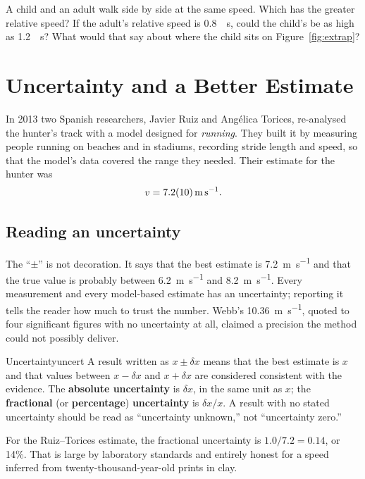 \documentclass[11pt,twoside,openany]{book}
\newcounter{check}[chapter]
\begin{document}
\begin{checkbox}
A child and an adult walk side by side at the same speed. Which has the greater relative speed? If the adult's relative speed is \SI{0.8}{\per\second}, could the child's be as high as \SI{1.2}{\per\second}? What would that say about where the child sits on Figure~\ref{fig:extrap}?
\end{checkbox}

\section{Uncertainty and a Better Estimate}

In 2013 two Spanish researchers, Javier Ruiz and Ang\'elica Torices, re-analysed the hunter's track with a model designed for \emph{running}. They built it by measuring people running on beaches and in stadiums, recording stride length and speed, so that the model's data covered the range they needed. Their estimate for the hunter was
\[
v = \SI{7.2 \pm 1.0}{\metre\per\second}.
\]

\subsection{Reading an uncertainty}

The ``$\pm$'' is not decoration. It says that the best estimate is \SI{7.2}{\metre\per\second} and that the true value is probably between \SI{6.2}{\metre\per\second} and \SI{8.2}{\metre\per\second}. Every measurement and every model-based estimate has an uncertainty; reporting it tells the reader how much to trust the number. Webb's \SI{10.36}{\metre\per\second}, quoted to four significant figures with no uncertainty at all, claimed a precision the method could not possibly deliver.

\begin{definition}{Uncertainty}{uncert}
A result written as $x \pm \delta x$ means that the best estimate is $x$ and that values between $x - \delta x$ and $x + \delta x$ are considered consistent with the evidence. The \textbf{absolute uncertainty} is $\delta x$, in the same unit as $x$; the \textbf{fractional} (or \textbf{percentage}) \textbf{uncertainty} is $\delta x/x$. A result with no stated uncertainty should be read as ``uncertainty unknown,'' not ``uncertainty zero.''
\end{definition}

For the Ruiz--Torices estimate, the fractional uncertainty is $1.0/7.2 = 0.14$, or \num{14}\%. That is large by laboratory standards and entirely honest for a speed inferred from twenty-thousand-year-old prints in clay.
\end{document}

